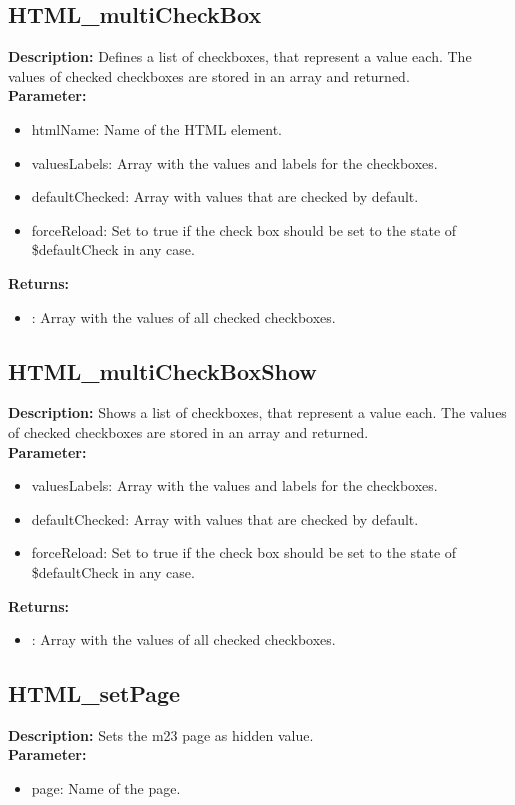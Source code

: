 \subsection{HTML\_multiCheckBox}
\textbf{Description:} Defines a list of checkboxes, that represent a value each. The values of checked checkboxes are stored in an array and returned.\\
\textbf{Parameter:}
\begin{itemize}
\item htmlName: Name of the HTML element.
\item valuesLabels: Array with the values and labels for the checkboxes.
\item defaultChecked: Array with values that are checked by default.
\item forceReload: Set to true if the check box should be set to the state of \$defaultCheck in any case.
\end{itemize}
\textbf{Returns:}
\begin{itemize}
\item : Array with the values of all checked checkboxes.
\end{itemize}

\subsection{HTML\_multiCheckBoxShow}
\textbf{Description:} Shows a list of checkboxes, that represent a value each. The values of checked checkboxes are stored in an array and returned.\\
\textbf{Parameter:}
\begin{itemize}
\item valuesLabels: Array with the values and labels for the checkboxes.
\item defaultChecked: Array with values that are checked by default.
\item forceReload: Set to true if the check box should be set to the state of \$defaultCheck in any case.
\end{itemize}
\textbf{Returns:}
\begin{itemize}
\item : Array with the values of all checked checkboxes.
\end{itemize}

\subsection{HTML\_setPage}
\textbf{Description:} Sets the m23 page as hidden value.\\
\textbf{Parameter:}
\begin{itemize}
\item page: Name of the page.
\end{itemize}

